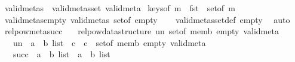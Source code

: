 \begin{isabellebody}
\isanewline
\isanewline
{}\isamarkupfalse%
\ {\isachardoublequoteopen}valid{\isacharunderscore}{\kern0pt}metas\ {\isasymequiv}\ valid{\isacharunderscore}{\kern0pt}metas{\isacharunderscore}{\kern0pt}set\ valid{\isacharunderscore}{\kern0pt}meta{\isachardoublequoteclose}\isanewline
\isanewline
{}\isamarkupfalse%
\ {\isachardoublequoteopen}keys{\isacharunderscore}{\kern0pt}of\ m\ {\isasymequiv}\ fst\ {\isacharbackquote}{\kern0pt}\ set{\isacharunderscore}{\kern0pt}of\ m{\isachardoublequoteclose}\isanewline
\isanewline
{}\isamarkupfalse%
\ valid{\isacharunderscore}{\kern0pt}metas{\isacharunderscore}{\kern0pt}empty{\isacharcolon}{\kern0pt}\ {\isachardoublequoteopen}valid{\isacharunderscore}{\kern0pt}metas\ {\isacharparenleft}{\kern0pt}set{\isacharunderscore}{\kern0pt}of\ empty{\isacharparenright}{\kern0pt}{\isachardoublequoteclose}\isanewline
%
\isadelimproof
\ \ %
\endisadelimproof
%
\isatagproof
{}\isamarkupfalse%
\ valid{\isacharunderscore}{\kern0pt}metas{\isacharunderscore}{\kern0pt}set{\isacharunderscore}{\kern0pt}def\ empty\ \isamarkupfalse%
\ auto%
\endisatagproof
{\isafoldproof}%
%
\isadelimproof
\isanewline
%
\endisadelimproof
\isanewline
{}\isamarkupfalse%
\isanewline
\isanewline
{}\isamarkupfalse%
\ relpow{\isacharunderscore}{\kern0pt}meta{\isacharunderscore}{\kern0pt}succ\ {\isacharequal}{\kern0pt}\isanewline
\ \ relpow{\isacharunderscore}{\kern0pt}data{\isacharunderscore}{\kern0pt}structure\ un\ set{\isacharunderscore}{\kern0pt}of\ memb\ empty\ valid{\isacharunderscore}{\kern0pt}meta\isanewline
\ \ \ un\ {\isacharcolon}{\kern0pt}{\isacharcolon}{\kern0pt}\ {\isachardoublequoteopen}{\isacharparenleft}{\kern0pt}{\isacharprime}{\kern0pt}a\ {\isacharasterisk}{\kern0pt}\ {\isacharprime}{\kern0pt}b{\isacharparenright}{\kern0pt}\ list\ {\isasymRightarrow}\ {\isacharprime}{\kern0pt}c\ {\isasymRightarrow}\ {\isacharprime}{\kern0pt}c{\isachardoublequoteclose}\ \ set{\isacharunderscore}{\kern0pt}of\ memb\ empty\ valid{\isacharunderscore}{\kern0pt}meta\ {\isacharplus}{\kern0pt}\isanewline
\ \ \ succ\ {\isacharcolon}{\kern0pt}{\isacharcolon}{\kern0pt}\ {\isachardoublequoteopen}{\isacharparenleft}{\kern0pt}{\isacharprime}{\kern0pt}a\ {\isacharasterisk}{\kern0pt}\ {\isacharprime}{\kern0pt}b{\isacharparenright}{\kern0pt}\ list\ {\isasymRightarrow}\ {\isacharparenleft}{\kern0pt}{\isacharprime}{\kern0pt}a\ {\isacharasterisk}{\kern0pt}\ {\isacharprime}{\kern0pt}b{\isacharparenright}{\kern0pt}\ list{\isachardoublequoteclose}\isanewline

\end{isabellebody}
